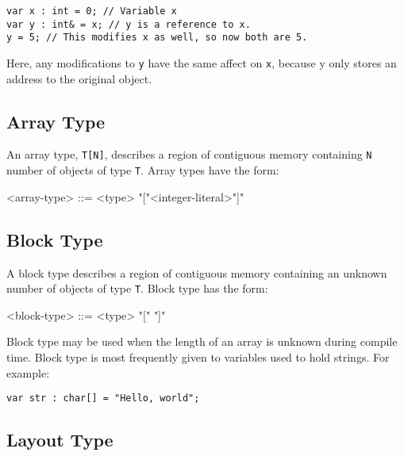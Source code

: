 \begin{minip}
\begin{lstlisting}
var x : int = 0; // Variable x
var y : int& = x; // y is a reference to x.
y = 5; // This modifies x as well, so now both are 5.
\end{lstlisting}
\end{minip}

Here, any modifications to \texttt{y} have the same affect on \texttt{x}, because y only stores an address to the original object.

\subsection{Array Type} \label{guide:array_type}

An array type, \texttt{T[N]}, describes a region of contiguous memory containing \texttt{N} number of objects of type \texttt{T}. Array types have the form: 

\begin{minip}
\begin{grammar}
<array-type> ::= <type> "["<integer-literal>"]"
\end{grammar}
\end{minip}

\subsection{Block Type} \label{guide:block_type}

A block type describes a region of contiguous memory containing an unknown number of objects of type \texttt{T}. Block type has the form:

\begin{minip}
\begin{grammar}
<block-type> ::= <type> "[" "]"
\end{grammar}
\end{minip}

Block type may be used when the length of an array is unknown during compile time. Block type is most frequently given to variables used to hold strings. For example:

\begin{minip}
\begin{lstlisting}
var str : char[] = "Hello, world";
\end{lstlisting}
\end{minip}

\subsection{Layout Type} \label{guide:layout_type}


